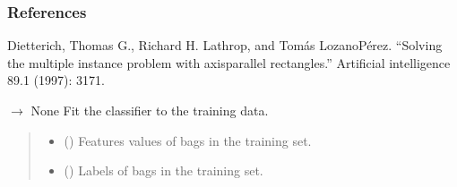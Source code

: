 \documentclass[letterpaper,10pt,english]{sphinxmanual}
\begin{document}
\begin{fulllineitems}
\subsubsection*{References}

\sphinxAtStartPar
Dietterich, Thomas G., Richard H. Lathrop, and Tomás Lozano\sphinxhyphen{}Pérez.
“Solving the multiple instance problem with axis\sphinxhyphen{}parallel rectangles.”
Artificial intelligence 89.1 (1997): 31\sphinxhyphen{}71.

\begin{fulllineitems}
\label{\detokenize{classifier/mi/_autosummary/miml.classifier.mi.apr_classifier.APRClassifier:miml.classifier.mi.apr_classifier.APRClassifier.fit}}
\pysigstartsignatures
\pysiglinewithargsret
{}
{\sphinxparamcomma {}}
{{ $\rightarrow$ None}}
\pysigstopsignatures
\sphinxAtStartPar
Fit the classifier to the training data.
\begin{quote}\begin{description}
\begin{itemize}
\item {} 
\sphinxAtStartPar
{} (\sphinxstyleliteralemphasis{\sphinxupquote{ (}}\sphinxstyleliteralemphasis{\sphinxupquote{, }}\sphinxstyleliteralemphasis{\sphinxupquote{, }}\sphinxstyleliteralemphasis{\sphinxupquote{)}}) \textendash{} Features values of bags in the training set.

\item {} 
\sphinxAtStartPar
{} (\sphinxstyleliteralemphasis{\sphinxupquote{ (}}\sphinxstyleliteralemphasis{\sphinxupquote{, }}\sphinxstyleliteralemphasis{\sphinxupquote{, }}\sphinxstyleliteralemphasis{\sphinxupquote{)}}) \textendash{} Labels of bags in the training set.


\end{itemize}
\end{description}
\end{quote}
\end{fulllineitems}
\end{fulllineitems}
\end{document}
